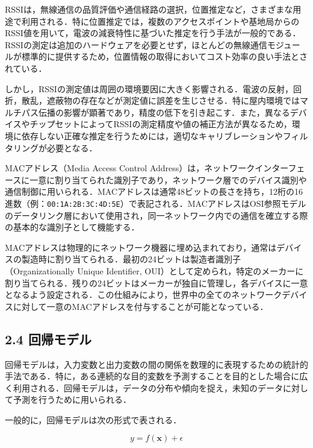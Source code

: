 RSSIは，無線通信の品質評価や通信経路の選択，位置推定など，さまざまな用途で利用される．特に位置推定では，複数のアクセスポイントや基地局からのRSSI値を用いて，電波の減衰特性に基づいた推定を行う手法が一般的である．RSSIの測定は追加のハードウェアを必要とせず，ほとんどの無線通信モジュールが標準的に提供するため，位置情報の取得においてコスト効率の良い手法とされている．

しかし，RSSIの測定値は周囲の環境要因に大きく影響される．電波の反射，回折，散乱，遮蔽物の存在などが測定値に誤差を生じさせる．特に屋内環境ではマルチパス伝播の影響が顕著であり，精度の低下を引き起こす．また，異なるデバイスやチップセットによってRSSIの測定精度や値の補正方法が異なるため，環境に依存しない正確な推定を行うためには，適切なキャリブレーションやフィルタリングが必要となる．


MACアドレス（Media Access Control Address）は，ネットワークインターフェースに一意に割り当てられた識別子であり，ネットワーク層でのデバイス識別や通信制御に用いられる．MACアドレスは通常48ビットの長さを持ち，12桁の16進数（例：\texttt{00:1A:2B:3C:4D:5E}）で表記される．MACアドレスはOSI参照モデルのデータリンク層において使用され，同一ネットワーク内での通信を確立する際の基本的な識別子として機能する．

MACアドレスは物理的にネットワーク機器に埋め込まれており，通常はデバイスの製造時に割り当てられる．最初の24ビットは製造者識別子（Organizationally Unique Identifier, OUI）として定められ，特定のメーカーに割り当てられる．残りの24ビットはメーカーが独自に管理し，各デバイスに一意となるよう設定される．この仕組みにより，世界中の全てのネットワークデバイスに対して一意のMACアドレスを付与することが可能となっている．

\subsection*{2.4 回帰モデル}
回帰モデルは，入力変数と出力変数の間の関係を数理的に表現するための統計的手法である．特に，ある連続的な目的変数を予測することを目的とした場合に広く利用される．回帰モデルは，データの分布や傾向を捉え，未知のデータに対して予測を行うために用いられる．

一般的に，回帰モデルは次の形式で表される．

\begin{equation}
	y = f(\mathbf{x}) + \epsilon
\end{equation}

